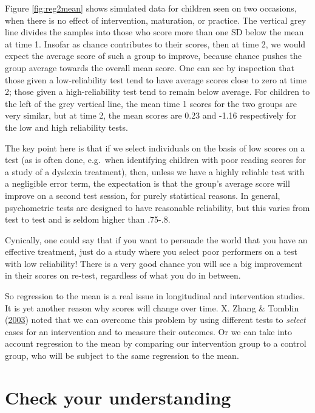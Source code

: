 \documentclass{krantz}
\begin{document}
Figure \ref{fig:reg2mean} shows simulated data for children seen on two occasions, when there is no effect of intervention, maturation, or practice. The vertical grey line divides the samples into those who score more than one SD below the mean at time 1. Insofar as chance contributes to their scores, then at time 2, we would expect the average score of such a group to improve, because chance pushes the group average towards the overall mean score. One can see by inspection that those given a low-reliability test tend to have average scores close to zero at time 2; those given a high-reliability test tend to remain below average. For children to the left of the grey vertical line, the mean time 1 scores for the two groups are very similar, but at time 2, the mean scores are 0.23 and -1.16 respectively for the low and high reliability tests.

The key point here is that if we select individuals on the basis of low scores on a test (as is often done, e.g.~when identifying children with poor reading scores for a study of a dyslexia treatment), then, unless we have a highly reliable test with a negligible error term, the expectation is that the group's average score will improve on a second test session, for purely statistical reasons. In general, psychometric tests are designed to have reasonable reliability, but this varies from test to test and is seldom higher than .75-.8.

Cynically, one could say that if you want to persuade the world that you have an effective treatment, just do a study where you select poor performers on a test with low reliability! There is a very good chance you will see a big improvement in their scores on re-test, regardless of what you do in between.

So regression to the mean is a real issue in longitudinal and intervention studies. It is yet another reason why scores will change over time. X. Zhang \& Tomblin (\protect\hyperlink{ref-zhang2003}{2003}) noted that we can overcome this problem by using different tests to \emph{select} cases for an intervention and to measure their outcomes. Or we can take into account regression to the mean by comparing our intervention group to a control group, who will be subject to the same regression to the mean.

\hypertarget{check-your-understanding-4}{%
\section{Check your understanding}\label{check-your-understanding-4}}
\end{document}
